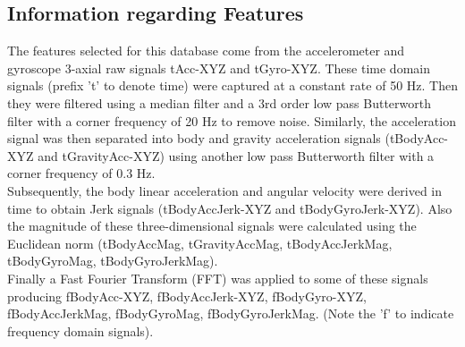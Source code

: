 \documentclass[12pt,a4paper]{report}
\begin{document}
	\subsection{Information regarding Features } 
	The features selected for this database come from the accelerometer and gyroscope 3-axial raw signals tAcc-XYZ and tGyro-XYZ. These time domain signals (prefix 't' to denote time) were captured at a constant rate of 50 Hz. Then they were filtered using a median filter and a 3rd order low pass Butterworth filter with a corner frequency of 20 Hz to remove noise. Similarly, the acceleration signal was then separated into body and gravity acceleration signals (tBodyAcc-XYZ and tGravityAcc-XYZ) using another low pass Butterworth filter with a corner frequency of 0.3 Hz.\\ 
	
	Subsequently, the body linear acceleration and angular velocity were derived in time to obtain Jerk signals (tBodyAccJerk-XYZ and tBodyGyroJerk-XYZ). Also the magnitude of these three-dimensional signals were calculated using the Euclidean norm (tBodyAccMag, tGravityAccMag, tBodyAccJerkMag, tBodyGyroMag, tBodyGyroJerkMag). 
	\\
	Finally a Fast Fourier Transform (FFT) was applied to some of these signals producing fBodyAcc-XYZ, fBodyAccJerk-XYZ, fBodyGyro-XYZ, fBodyAccJerkMag, fBodyGyroMag, fBodyGyroJerkMag. (Note the 'f' to indicate frequency domain signals). \\
	
\end{document}
